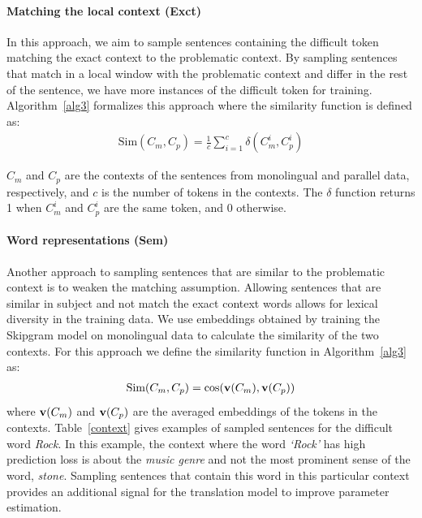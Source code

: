 \paragraph{Matching the local context (Exct)}

In this approach, we aim to sample sentences containing the difficult token matching the exact context to the problematic context.
By sampling sentences that match in a local window with the problematic context and differ in the rest of the sentence, we have more instances of the difficult token for training.
Algorithm~\ref{alg3} formalizes this approach where the similarity function is defined as:
\begin{align}
\text{Sim}(C_m, C_p) = \frac{1}{c} \sum_{i=1}^{c}\delta(C_m^i, C_p^i)
\end{align}

\noindent $C_m$ and $C_p$ are the contexts of the sentences from monolingual and parallel data, respectively, and $c$ is the number of tokens in the contexts. The $\delta$ function returns 1 when $C_m^i$ and $C_p^i$ are the same token, and 0 otherwise. 

\paragraph{Word representations (Sem)}

Another approach to sampling sentences that are similar to the problematic context is to weaken the matching assumption.
Allowing sentences that are similar in subject and not match the exact context words allows for lexical diversity in the training data.
We use embeddings obtained by training the Skipgram model \citep{mikolov2013efficient} on monolingual data to calculate the similarity of the two contexts.
For this approach we define the similarity function in Algorithm~\ref{alg3} as:
\begin{align}
\text{Sim}(C_m, C_p)  = \cos(\bm{\mathbf{v}}(C_m), \bm{\mathbf{v}}(C_p))
\end{align}
where $\bm{\mathbf{v}}(C_m)$ and $\bm{\mathbf{v}}(C_p)$ are the averaged embeddings of the tokens in the contexts.
%
Table~\ref{context} gives examples of sampled sentences for the difficult word \textit{Rock}.
In this example, the context where the word \textit{`Rock'} has high prediction loss is about the \textit{music genre} and not the most prominent sense of the word, \textit{stone}.
Sampling sentences that contain this word in this particular context provides an additional signal for the translation model to improve parameter estimation. 

